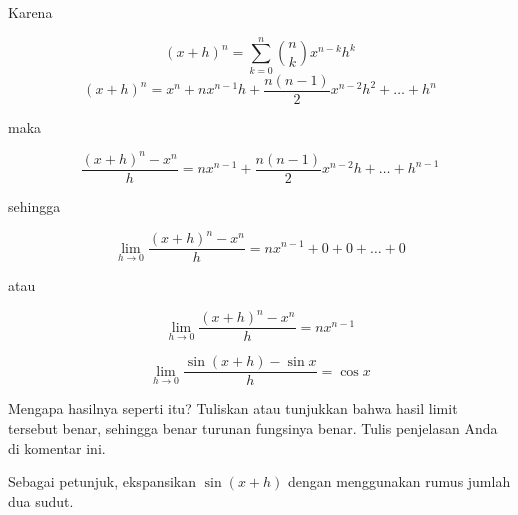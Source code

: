 \documentclass[a4paper,11pt,oneside,enabledeprecatedfontcommands]{scrbook}
\newenvironment{eulernotebook}{}{}
\newenvironment{eulercomment}{\par\medskip\noindent}{\par\medskip}
\newenvironment{eulerformula}{}{}
\begin{document}
\begin{eulernotebook}
\begin{eulercomment}
Karena
\end{eulercomment}
\begin{eulerformula}
\[
(x+h)^n = \sum_{k=0}^{n} \binom{n}{k} x^{n-k} h^k
\]
\end{eulerformula}
\begin{eulerformula}
\[
(x+h)^n = x^n + n x^{n-1} h + \frac{n(n-1)}{2} x^{n-2} h^2 + \dots + h^n
\]
\end{eulerformula}
\begin{eulercomment}
maka
\end{eulercomment}
\begin{eulerformula}
\[
\frac{(x+h)^n-x^n}{h}=nx^{n-1} + \frac{n(n-1)}{2} x^{n-2}h + \dots + h^{n-1}
\]
\end{eulerformula}
\begin{eulercomment}
sehingga
\end{eulercomment}
\begin{eulerformula}
\[
\lim_{h \to 0} \frac{(x+h)^n - x^n}{h}=nx^{n-1}+0+0+\dots +0
\]
\end{eulerformula}
\begin{eulercomment}
atau
\end{eulercomment}
\begin{eulerformula}
\[
\lim_{h \to 0} \frac{(x+h)^n - x^n}{h}=nx^{n-1}
\]
\end{eulerformula}
\begin{eulerformula}
\[
\lim_{h\rightarrow 0}{\frac{\sin \left(x+h\right)-\sin x}{h}}=\cos   x
\]
\end{eulerformula}
\begin{eulercomment}
Mengapa hasilnya seperti itu? Tuliskan atau tunjukkan bahwa hasil limit tersebut benar, sehingga benar turunan fungsinya benar. Tulis penjelasan Anda di komentar ini.

Sebagai petunjuk, ekspansikan $\sin(x+h)$ dengan menggunakan rumus jumlah dua sudut.


\end{eulercomment}
\end{eulernotebook}
\end{document}
